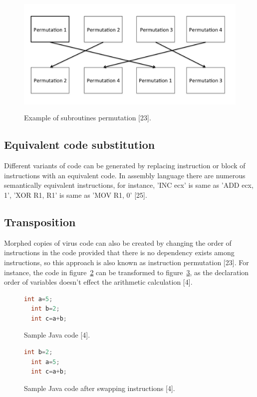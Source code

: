 \begin{figure}
  \centering
      \includegraphics[width=12cm, height=6cm]{subpermutation.jpg}
    \caption[Example of subroutines permutation]{Example of subroutines permutation [23].}
    \label{fig:subpermutation}
\end{figure}

\subsection{Equivalent code substitution} 
Different variants of code can be generated by replacing instruction or block of instructions with an equivalent code. In assembly language there are numerous semantically equivalent instructions, for instance, 'INC ecx' is same as 'ADD ecx, 1', 'XOR R1, R1' is same as 'MOV R1, 0' [25].

\subsection{Transposition} 
Morphed copies of virus code can also be created by changing the order of instructions in the code provided that there is no dependency exists among instructions, so this approach is also known as instruction permutation [23]. For instance, the code in figure~\ref{fig:beforetrans} can be transformed to figure~\ref{fig:aftertrans}, as the declaration order of variables doesn't effect the arithmetic calculation [4]. 

\begin{figure}
  \centering
  \begin{lstlisting}[language=Java]
  int a=5;
  int b=2;
  int c=a+b;
\end{lstlisting}
    \caption[Sample Java code]{Sample Java code [4].}
    \label{fig:beforetrans}
\end{figure}

\begin{figure}
  \centering
  \begin{lstlisting}[language=Java]
  int b=2;
  int a=5;
  int c=a+b;
\end{lstlisting}
    \caption[Sample Java code after applying Transposition]{Sample Java code after swapping instructions  [4].}
    \label{fig:aftertrans}
\end{figure}

